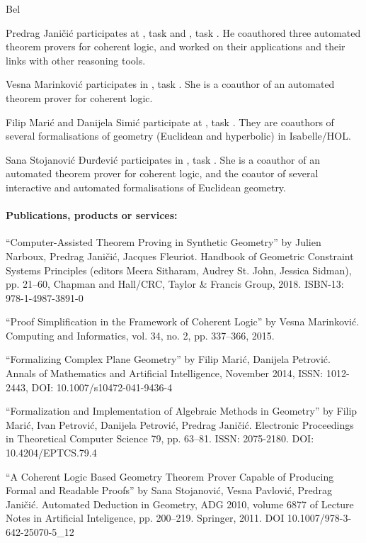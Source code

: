 \begin{sitedescription}{Bel}
  \begin{compactitem}
  \item Predrag Janičić participates at , task
     and 
    , task . 
    He coauthored three automated theorem provers for coherent 
    logic, and worked on their applications and their links 
    with other reasoning tools.
  \item Vesna Marinković participates in , task
    . She is a coauthor of an automated
    theorem prover for coherent logic.
  \item Filip Marić and Danijela Simić participate at
    , task
    . They are coauthors of
    several formalisations of geometry (Euclidean and hyperbolic) in
    Isabelle/HOL.
  \item Sana Stojanović Đurđević participates in ,
    task . She is a coauthor of
    an automated theorem prover for coherent logic, and the coautor of
    several interactive and automated formalisations of Euclidean
    geometry.
  \end{compactitem}
  
  \paragraph*{Publications, products or services:}

  \begin{compactitem}
  \item ``Computer-Assisted Theorem Proving in Synthetic Geometry'' by
    Julien Narboux, Predrag Janičić, Jacques Fleuriot. Handbook of
    Geometric Constraint Systems Principles (editors Meera Sitharam,
    Audrey St. John, Jessica Sidman), pp. 21--60, Chapman and
    Hall/CRC, Taylor \& Francis Group, 2018. ISBN-13: 978-1-4987-3891-0
  \item ``Proof Simplification in the Framework of Coherent Logic'' by
    Vesna Marinković. Computing and Informatics, vol. 34, no. 2,
    pp. 337--366, 2015.
  \item ``Formalizing Complex Plane Geometry'' by Filip Marić,
    Danijela Petrović. Annals of Mathematics and Artificial
    Intelligence, November 2014, ISSN: 1012-2443, DOI:
    10.1007/s10472-041-9436-4
  \item ``Formalization and Implementation of Algebraic Methods in
    Geometry'' by Filip Marić, Ivan Petrović, Danijela Petrović,
    Predrag Janičić. Electronic Proceedings in Theoretical Computer
    Science 79, pp. 63--81. ISSN: 2075-2180. DOI: 10.4204/EPTCS.79.4
  \item ``A Coherent Logic Based Geometry Theorem Prover Capable of
    Producing Formal and Readable Proofs'' by Sana Stojanović, Vesna
    Pavlović, Predrag Janičić. Automated Deduction in Geometry, ADG
    2010, volume 6877 of Lecture Notes in Artificial Inteligence,
    pp. 200--219. Springer, 2011. DOI 10.1007/978-3-642-25070-5\_12
  \end{compactitem}
    

\end{sitedescription}
